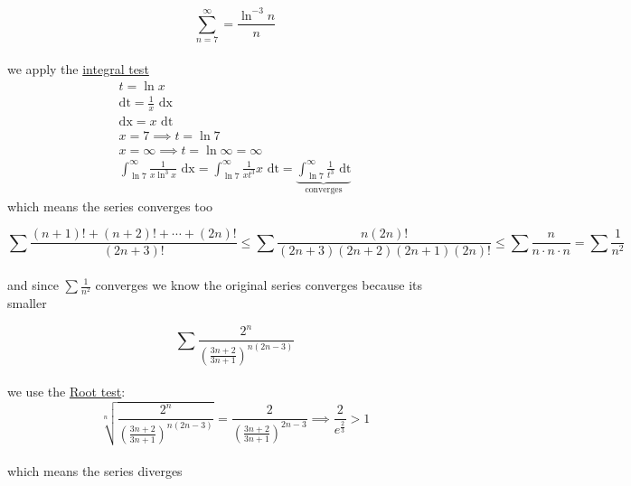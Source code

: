 \documentclass[a4paper,12pt]{article}
\newcommand{\?}{\stackrel{?}{=}}
\begin{document}
\begin{definition}
\begin{my_example}
\[
  \sum_{n=7}^\infty = \frac{\ln^{-3} n}{n}
\]\\[0pt]
we apply the \hyperref[sec:org8492316]{integral test}\\[0pt]
\begin{gather*}
  t = \ln x\\
  \text{dt} = \frac1x \text{ dx}\\
  \text{dx} = x\text{ dt}\\
  x=7 \implies t=\ln7\\
  x=\infty \implies t=\ln\infty=\infty\\
  \int_{\ln7}^\infty \frac{1}{x\ln^3 x} \text{ dx} = \int_{\ln7}^\infty \frac{1}{xt^3} x \text{ dt} = \underbrace{\int_{\ln7}^\infty \frac{1}{t^3} \text{ dt}}_{\text{converges}}
\end{gather*}
which means the series converges too\\[0pt]
\end{my_example}

\begin{my_example}
\[
  \sum \frac{(n+1)! + (n+2)! + \cdots + (2n)!}{(2n+3)!} \leq \sum \frac{n(2n)!}{(2n+3)(2n+2)(2n+1)(2n)!} \leq \sum \frac{n}{n \cdot n \cdot n} = \sum \frac{1}{n^2}
\]\\[0pt]
and since \(\sum \frac{1}{n^2}\) converges we know the original series converges because its smaller\\[0pt]
\end{my_example}

\begin{my_example}
\[
  \sum \frac{2^n}{\left(\frac{3n+2}{3n+1}\right)^{n(2n-3)}}
\]\\[0pt]
we use the \hyperref[sec:org88b6001]{Root test}:\\[0pt]
\[
  \sqrt[n]{\frac{2^n}{\left(\frac{3n+2}{3n+1}\right)^{n(2n-3)}}} = \frac{2}{\left(\frac{3n+2}{3n+1}\right)^{2n-3}} \implies \frac{2}{e^{\frac23}} > 1
\]\\[0pt]
which means the series diverges\\[0pt]
\end{my_example}
\end{definition}
\end{document}
